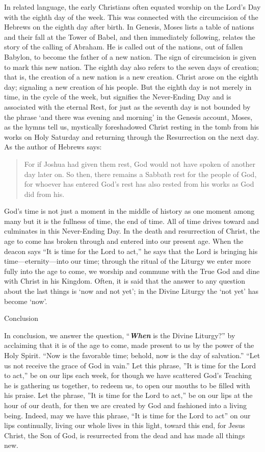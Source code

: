 \documentclass[
]{article}
\newcommand{\RL}[1]{\beginR #1\endR}
\begin{document}
In related language, the early Christians often equated worship on the
Lord's Day with the eighth day of the week. This was connected with the
circumcision of the Hebrews on the eighth day after birth. In Genesis,
Moses lists a table of nations and their fall at the Tower of Babel, and
then immediately following, relates the story of the calling of Abraham.
He is called out of the nations, out of fallen Babylon, to become the
father of a new nation. The sign of circumcision is given to mark this
new nation. The eighth day also refers to the seven days of creation;
that is, the creation of a new nation is a new creation. Christ arose on
the eighth day; signaling a new creation of his people. But the eighth
day is not merely in time, in the cycle of the week, but signifies the
Never-Ending Day and is associated with the eternal Rest, for just as
the seventh day is not bounded by the phrase `and there was evening and
morning' in the Genesis account, Moses, as the hymns tell us, mystically
foreshadowed Christ resting in the tomb from his works on Holy Saturday
and returning through the Resurrection on the next day. As the author of
Hebrews says:

\begin{quote}
For if Joshua had given them rest, God would not have spoken of another
day later on. So then, there remains a Sabbath rest for the people of
God, for whoever has entered God\RL{'}s rest has also rested from his
works as God did from his.
\end{quote}

God\RL{'}s time is not just a moment in the middle of history as one
moment among many but it is the fullness of time, the end of time. All
of time drives toward and culminates in this Never-Ending Day. In the
death and resurrection of Christ, the age to come has broken through and
entered into our present age. When the deacon says ``It is time for the
Lord to act,'' he says that the Lord is bringing his
time---eternity---into our time; through the ritual of the Liturgy we
enter more fully into the age to come, we worship and commune with the
True God and dine with Christ in his Kingdom. Often, it is said that the
answer to any question about the last things is `now and not yet'; in
the Divine Liturgy the `not yet' has become `now'.

Conclusion

In conclusion, we answer the question, ``\textbf{\emph{When}} is the
Divine Liturgy?'' by acclaiming that it is of the age to come, made
present to us by the power of the Holy Spirit. ``Now is the favorable
time; behold, now is the day of salvation.'' ``Let us not receive the
grace of God in vain.'' Let this phrase, \RL{''}It is time for the Lord
to act,'' be on our lips each week, for though we have scattered
God\RL{'}s Teaching he is gathering us together, to redeem us, to open
our mouths to be filled with his praise. Let the phrase, \RL{''}It is
time for the Lord to act,'' be on our lips at the hour of our death, for
then we are created by God and fashioned into a living being. Indeed,
may we have this phrase, ``It is time for the Lord to act'' on our lips
continually, living our whole lives in this light, toward this end, for
Jesus Christ, the Son of God, is resurrected from the dead and has made
all things new.
\end{document}
